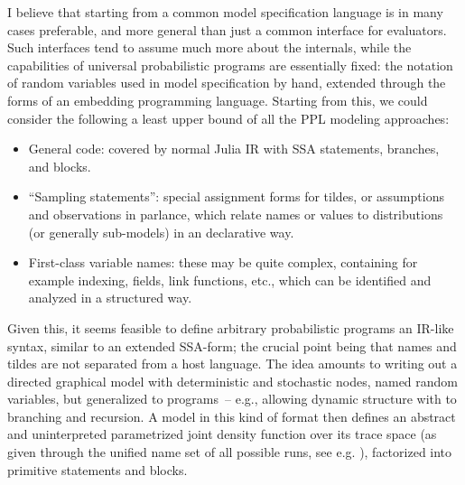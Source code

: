 I believe that starting from a common model specification language is in many cases preferable, and
more general than just a common interface for evaluators.  Such interfaces tend to assume much more
about the internals, while the capabilities of universal probabilistic programs are essentially
fixed: the notation of random variables used in model specification by hand, extended through the
forms of an embedding programming language.  Starting from this, we could consider the following a
least upper bound of all the PPL modeling approaches:
\begin{itemize}
  \firmlist
\item General code: covered by normal Julia IR with SSA statements, branches, and blocks.
\item \enquote{Sampling statements}: special assignment forms for tildes, or assumptions and
  observations in \turingjl{} parlance, which relate names or values to distributions (or generally
  sub-models) in an declarative way.
\item First-class variable names: these may be quite complex, containing for example indexing,
  fields, link functions, etc., which can be identified and analyzed in a structured way.
\end{itemize}
Given this, it seems feasible to define arbitrary probabilistic programs an IR-like syntax, similar
to an extended SSA-form; the crucial point being that names and tildes are not separated from a host
language.  The idea amounts to writing out a directed graphical model with deterministic and
stochastic nodes, named random variables, but generalized to programs~-- e.g., allowing dynamic
structure with to branching and recursion.  A model in this kind of format then defines an abstract
and uninterpreted parametrized joint density function over its trace space (as given through the
unified name set of all possible runs, see e.g. \textcite{lew2020trace}), factorized into primitive
statements and blocks.

